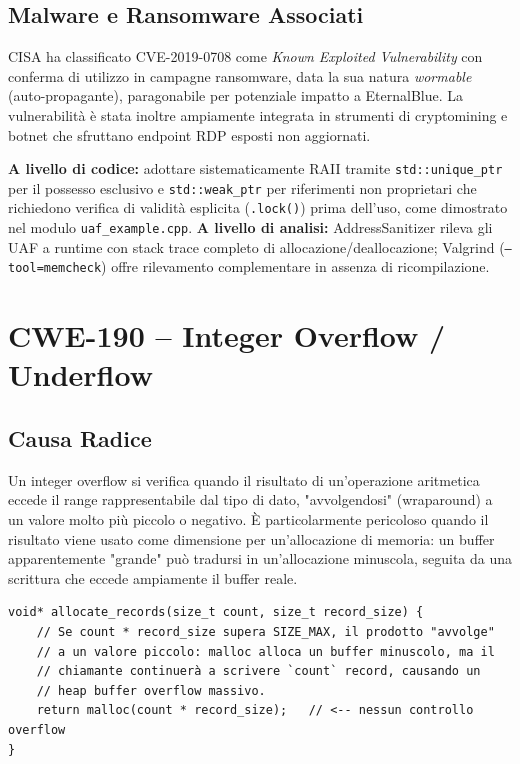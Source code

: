 \documentclass[11pt,a4paper]{article}
\begin{document}
\subsection{Malware e Ransomware Associati}

CISA ha classificato CVE-2019-0708 come \textit{Known Exploited Vulnerability} con conferma di utilizzo in campagne ransomware, data la sua natura \textit{wormable} (auto-propagante), paragonabile per potenziale impatto a EternalBlue. La vulnerabilità è stata inoltre ampiamente integrata in strumenti di cryptomining e botnet che sfruttano endpoint RDP esposti non aggiornati.

\begin{mitigationbox}
\textbf{A livello di codice:} adottare sistematicamente RAII tramite \texttt{std::unique\_ptr} per il possesso esclusivo e \texttt{std::weak\_ptr} per riferimenti non proprietari che richiedono verifica di validità esplicita (\texttt{.lock()}) prima dell'uso, come dimostrato nel modulo \texttt{uaf\_example.cpp}. \textbf{A livello di analisi:} AddressSanitizer rileva gli UAF a runtime con stack trace completo di allocazione/deallocazione; Valgrind (\texttt{--tool=memcheck}) offre rilevamento complementare in assenza di ricompilazione.
\end{mitigationbox}

\section{CWE-190 -- Integer Overflow / Underflow}

\subsection{Causa Radice}

Un integer overflow si verifica quando il risultato di un'operazione aritmetica eccede il range rappresentabile dal tipo di dato, "avvolgendosi" (wraparound) a un valore molto più piccolo o negativo. È particolarmente pericoloso quando il risultato viene usato come dimensione per un'allocazione di memoria: un buffer apparentemente "grande" può tradursi in un'allocazione minuscola, seguita da una scrittura che eccede ampiamente il buffer reale.

\begin{lstlisting}[caption={Pattern vulnerabile (CWE-190)}]
void* allocate_records(size_t count, size_t record_size) {
    // Se count * record_size supera SIZE_MAX, il prodotto "avvolge"
    // a un valore piccolo: malloc alloca un buffer minuscolo, ma il
    // chiamante continuerà a scrivere `count` record, causando un
    // heap buffer overflow massivo.
    return malloc(count * record_size);   // <-- nessun controllo overflow
}
\end{lstlisting}
\end{document}
